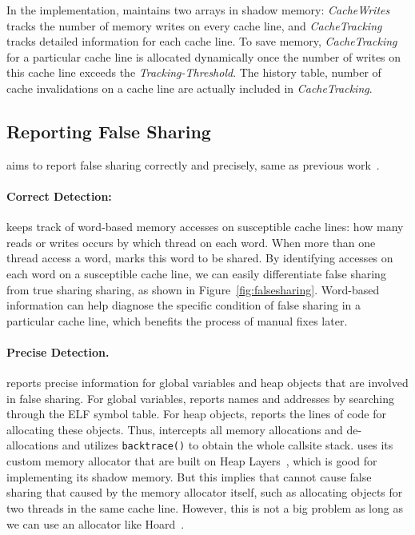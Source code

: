 In the implementation, \Cheetah{} maintains two arrays in shadow memory: {\it CacheWrites} tracks the number of memory writes on every cache line, and {\it CacheTracking} tracks detailed information for each cache line. To save memory, {\it CacheTracking} for a particular cache line is allocated dynamically once the number of writes on this cache line exceeds the {\it Tracking-Threshold}. The history table, number of cache invalidations on a cache line are actually included in {\it CacheTracking}. 
 
 \subsection{Reporting False Sharing}
\Cheetah{} aims to report false sharing correctly and precisely, same as previous work~\cite{sheriff, Predator}. 

\paragraph{Correct Detection:} \Cheetah{} keeps track of word-based memory accesses on susceptible cache lines: how many reads or writes occurs by which thread on each word. When more than one thread access a word, \Cheetah{} marks this word to be shared. By identifying accesses on each word on a susceptible cache line, we can easily differentiate false sharing from true sharing sharing, as shown in Figure~\ref{fig:falsesharing}. Word-based information can help diagnose the specific condition of false sharing in a particular cache line, which benefits the process of manual fixes later.  

\paragraph{Precise Detection.} \Cheetah{} reports precise information for global variables and heap objects that are involved in false sharing. For global variables, \Cheetah{} reports names and addresses by searching through the ELF symbol table. For heap objects, \Cheetah{} reports the lines of code for allocating these objects.  
Thus, \Cheetah{} intercepts all memory allocations and de-allocations and utilizes \texttt{backtrace()} to obtain the whole callsite stack.  \Cheetah{} uses its custom memory allocator that are built on Heap Layers~\cite{heaplayers}, which is good for implementing its shadow memory. But this implies that \Cheetah{} cannot cause false sharing that caused by the memory allocator itself, such as allocating objects for two threads in the same cache line. However, this is not a big problem as long as we can use an allocator like Hoard~\cite{Hoard}. 

